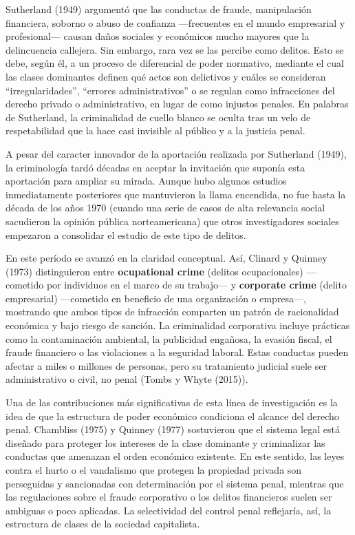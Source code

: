 \documentclass[
  spanish,
  letterpaper,
  DIV=11,
  numbers=noendperiod]{scrreprt}
\begin{document}
Sutherland (1949) argumentó que las conductas de fraude, manipulación
financiera, soborno o abuso de confianza ---frecuentes en el mundo
empresarial y profesional--- causan daños sociales y económicos mucho
mayores que la delincuencia callejera. Sin embargo, rara vez se las
percibe como delitos. Esto se debe, según él, a un proceso de
diferencial de poder normativo, mediante el cual las clases dominantes
definen qué actos son delictivos y cuáles se consideran
``irregularidades'', ``errores administrativos'' o se regulan como
infracciones del derecho privado o administrativo, en lugar de como
injustos penales. En palabras de Sutherland, la criminalidad de cuello
blanco se oculta tras un velo de respetabilidad que la hace casi
invisible al público y a la justicia penal.

A pesar del caracter innovador de la aportación realizada por Sutherland
(1949), la criminología tardó décadas en aceptar la invitación que
suponía esta aportación para ampliar su mirada. Aunque hubo algunos
estudios inmediatamente posteriores que mantuvieron la llama encendida,
no fue hasta la década de los años 1970 (cuando una serie de casos de
alta relevancia social sacudieron la opinión pública norteamericana) que
otros investigadores sociales empezaron a consolidar el estudio de este
tipo de delitos.

En este período se avanzó en la claridad conceptual. Así, Clinard y
Quinney (1973) distinguieron entre \textbf{ocupational crime} (delitos
ocupacionales) ---cometido por individuos en el marco de su trabajo--- y
\textbf{corporate crime} (delito empresarial) ---cometido en beneficio
de una organización o empresa---, mostrando que ambos tipos de
infracción comparten un patrón de racionalidad económica y bajo riesgo
de sanción. La criminalidad corporativa incluye prácticas como la
contaminación ambiental, la publicidad engañosa, la evasión fiscal, el
fraude financiero o las violaciones a la seguridad laboral. Estas
conductas pueden afectar a miles o millones de personas, pero su
tratamiento judicial suele ser administrativo o civil, no penal (Tombs y
Whyte (2015)).

Una de las contribuciones más significativas de esta línea de
investigación es la idea de que la estructura de poder económico
condiciona el alcance del derecho penal. Chambliss (1975) y Quinney
(1977) sostuvieron que el sistema legal está diseñado para proteger los
intereses de la clase dominante y criminalizar las conductas que
amenazan el orden económico existente. En este sentido, las leyes contra
el hurto o el vandalismo que protegen la propiedad privada son
perseguidas y sancionadas con determinación por el sistema penal,
mientras que las regulaciones sobre el fraude corporativo o los delitos
financieros suelen ser ambiguas o poco aplicadas. La selectividad del
control penal reflejaría, así, la estructura de clases de la sociedad
capitalista.
\end{document}
